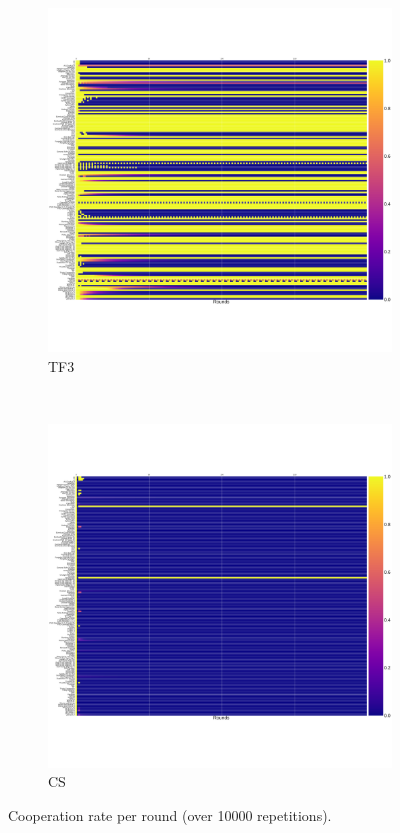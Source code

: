 \documentclass{article}
\begin{document}
\begin{figure}[!hbtp]
    \begin{subfigure}[t]{.5\textwidth}
        \centering
        \includegraphics[width=\textwidth]{./img/cooperation_0_0_10000_TF3_array.pdf}
        \caption{TF3}
    \end{subfigure}%
    ~
    \begin{subfigure}[t]{.5\textwidth}
        \centering
        \includegraphics[width=\textwidth]{./img/cooperation_0_0_10000_CS_array.pdf}
        \caption{CS}
    \end{subfigure}
    \caption{Cooperation rate per round (over 10000 repetitions).}
    \label{fig:cooperation_rates}
\end{figure}
\end{document}
